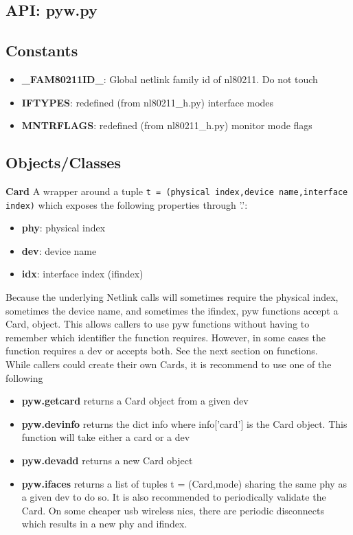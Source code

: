 \documentclass[11pt]{article}
\begin{document}
\begin{appendices}
\section{API: pyw.py}\label{sec:pywapi}

\subsection{Constants}
\begin{itemize}
\item \textbf{\_FAM80211ID\_}: Global netlink family id of nl80211. Do not touch
\item \textbf{IFTYPES}: redefined (from nl80211\_h.py) interface modes
\item \textbf{MNTRFLAGS}: redefined (from nl80211\_h.py) monitor mode flags
\end{itemize}

\subsection{Objects/Classes}
\textbf{Card} A wrapper around a tuple 
\texttt{t = (physical index,device name,interface index)}
which exposes the following properties through '.':
\begin{itemize}
\item \textbf{phy}: physical index
\item \textbf{dev}: device name
\item \textbf{idx}: interface index (ifindex)
\end{itemize}
Because the underlying Netlink calls will sometimes require the physical index,
sometimes the device name, and sometimes the ifindex, pyw functions accept a Card,
object. This allows callers to use pyw functions without having to remember which 
identifier the function requires. However, in some cases the function requires 
a dev or accepts both. See the next section on functions.\\

While callers could create their own Cards, it is recommend to use one of the following
\begin{itemize}
\item \textbf{pyw.getcard} returns a Card object from a given dev
\item \textbf{pyw.devinfo} returns the dict info where info['card'] is the Card 
object. This function will take either a card or a dev
\item \textbf{pyw.devadd} returns a new Card object
\item \textbf{pyw.ifaces} returns a list of tuples t = (Card,mode) sharing the 
same phy as a given dev
to do so. It is also recommended to periodically validate the Card. On some 
cheaper usb wireless nics, there are periodic disconnects which results in a new 
phy and ifindex.
\end{itemize}


\end{appendices}
\end{document}
